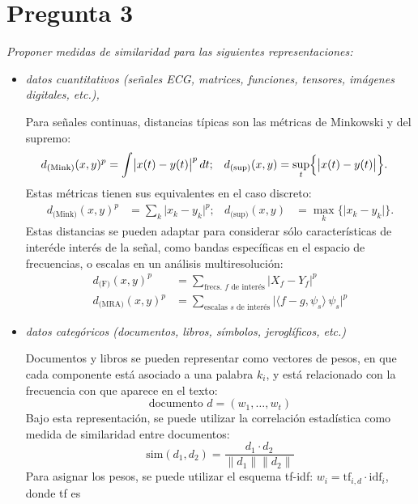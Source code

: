 \documentclass[spanish]{article}
\newcommand{\pregunta}{\textit}
\newcommand{\abs}[1]{\lvert#1\rvert}
\newcommand{\norm}[1]{\lVert#1\rVert}
\begin{document}
\section*{Pregunta 3}
\pregunta{Proponer medidas de similaridad para las siguientes representaciones:}
    \begin{itemize}
        \item \pregunta{datos cuantitativos
            (señales ECG, matrices, funciones, tensores, imágenes digitales, etc.),}

            Para señales continuas, distancias típicas son las métricas de Minkowski y
            del supremo:
            \begin{align}
                d_{\text{(Mink)}}(x, y)^p &= \int\bigl\lvert x(t) - y(t)\bigr\rvert^{p}\,dt; &
                d_{\text{(sup)}}(x, y) &= \sup_t \Bigl\{\bigl\lvert x(t) - y(t)\bigr\rvert\Bigr\}.
            \end{align}
            Estas métricas tienen sus equivalentes en el caso discreto:
            \begin{align}
                d_{\text{(Mink)}}(x, y)^p &= \sum_k \abs{x_k - y_k}^p; &
                d_{\text{(sup)}}(x, y) &= \max_k\bigl\{\abs{x_k - y_k}\bigr\}.
            \end{align}
            Estas distancias se pueden adaptar para considerar sólo características de interéde
            interés de la
            señal, como bandas específicas en el espacio de frecuencias, o escalas en un análisis
            multiresolución:
            \begin{align}
                d_{\text{(F)}}(x, y)^p   &= 
                    \sum_{\text{frecs. $f$ de interés}} \abs{X_f - Y_f}^p \\
                d_{\text{(MRA)}}(x, y)^p &= 
                    \sum_{\text{escalas $s$ de interés}}
                    \bigl\lvert\langle f - g, \psi_s \rangle\,\psi_s \bigr\rvert^p
            \end{align}

        \item \pregunta{datos categóricos
            (documentos, libros, símbolos, jeroglíficos, etc.)}

            Documentos y libros se pueden representar como vectores de pesos, en que cada componente
            está asociado a una palabra $k_i$, y está relacionado con la frecuencia con que aparece en el
            texto:
            \begin{equation}
                \text{documento $d$} = (w_1, \ldots, w_t)
            \end{equation}
            Bajo esta representación, se puede utilizar la correlación estadística como medida de
            similaridad entre documentos:
            \begin{equation}
                \text{sim}(d_1, d_2) = \frac{d_1\cdot d_2}{\norm{d_1}\norm{d_2}}
            \end{equation}
            Para asignar los pesos, se puede utilizar el esquema tf-idf:  $w_i =
            \text{tf}_{i,d}\cdot\text{idf}_i$, donde tf es 


    \end{itemize}
\end{document}
